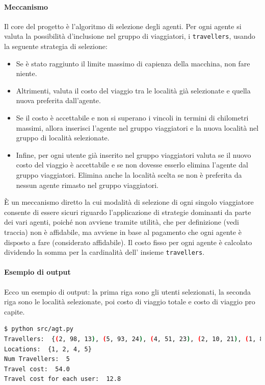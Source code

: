 \documentclass{article}
\begin{document}
\paragraph*{Meccanismo}
Il core del progetto è l'algoritmo di selezione degli agenti. Per ogni agente si valuta la possibilità d'inclusione nel gruppo di viaggiatori, i \verb|travellers|, usando la seguente strategia di selezione:
\begin{itemize}
  \item Se è stato raggiunto il limite massimo di capienza della macchina, non fare niente.
  \item Altrimenti, valuta il costo del viaggio tra le località già selezionate e quella nuova preferita dall'agente.
  \item Se il costo è accettabile e non si superano i vincoli in termini di chilometri massimi, allora inserisci l'agente nel gruppo viaggiatori e la nuova località nel gruppo di località selezionate.
  \item Infine, per ogni utente già inserito nel gruppo viaggiatori valuta se il nuovo costo del viaggio è accettabile e se non dovesse esserlo elimina l'agente dal gruppo viaggiatori. Elimina anche la località scelta se non è preferita da nessun agente rimasto nel gruppo viaggiatori.
\end{itemize}
È un meccanismo diretto la cui modalità di selezione di ogni singolo viaggiatore consente di essere sicuri riguardo l'applicazione di strategie dominanti da parte dei vari agenti, poiché non avviene tramite utilità, che per definizione (vedi traccia) non è affidabile, ma avviene in base al pagamento che ogni agente è disposto a fare (considerato affidabile).
Il costo fisso per ogni agente è calcolato dividendo la somma per la cardinalità dell' insieme \verb|travellers|.
\paragraph*{Esempio di output}
Ecco un esempio di output: la prima riga sono gli utenti selezionati, la seconda riga sono le località selezionate, poi costo di viaggio totale e costo di viaggio pro capite.
\begin{lstlisting}[language=bash]
$ python src/agt.py
Travellers:  {(2, 98, 13), (5, 93, 24), (4, 51, 23), (2, 10, 21), (1, 84, 24)}
Locations:  {1, 2, 4, 5}
Num Travellers:  5
Travel cost:  54.0
Travel cost for each user:  12.8
\end{lstlisting}
\end{document}
